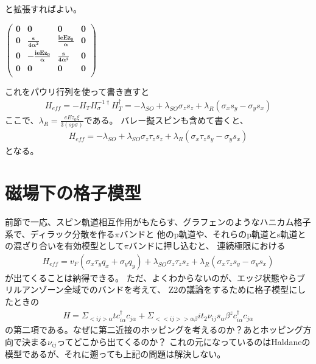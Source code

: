 \documentclass{article}
\begin{document}
と拡張すればよい。

\begin{doublespace}
\noindent\(\pmb{\left(
\begin{array}{cccc}
 0 & 0 & 0 & 0 \\
 0 & \frac{s}{4 \alpha ^2} & \frac{i \text{e$Ez_0$}}{ \alpha } & 0 \\
 0 & -\frac{i \text{e$Ez_0$}}{ \alpha } & \frac{s}{4 \alpha ^2} & 0 \\
 0 & 0 & 0 & 0 \\
\end{array}
\right)}\)
\end{doublespace}

これをパウリ行列を使って書き直すと
\begin{eqnarray}
H_{eff}=-H_T
H_\sigma^{-1\dagger}H_T^\dagger = -\lambda_{SO}+\lambda_{SO} \sigma_z
s_z+\lambda_{R} (\sigma_x s_y -\sigma_{y} s_x)
\end{eqnarray}
ここで、$\lambda_R=\frac{eEz_0 \xi}{3(sp\sigma)}$である。
バレー擬スピンも含めて書くと、
\begin{eqnarray}
H_{eff}= -\lambda_{SO}+\lambda_{SO} \sigma_z \tau_z s_z+\lambda_{R} (\sigma_x
\tau_z s_y -\sigma_{y} s_x)
\end{eqnarray}
となる。

\section{磁場下の格子模型}
前節で一応、スピン軌道相互作用がもたらす、グラフェンのようなハニカム格子系で、ディラック分散を作る$\pi$バンドと
他のp軌道や、それらのp軌道とs軌道との混ざり合いを有効模型として$\pi$バンドに押し込むと、
連続極限における
\begin{eqnarray}
H_{eff}=  v_F (\sigma_x\tau_y q_x + \sigma_y q_y)+\lambda_{SO} \sigma_z \tau_z
s_z+\lambda_{R} (\sigma_x \tau_z s_y -\sigma_{y} s_x)
\end{eqnarray}
が出てくることは納得できる。
ただ、よくわからないのが、エッジ状態やらブリルアンゾーン全域でのバンドを考えて、
Z2の議論をするために格子模型にしたときの
\begin{eqnarray}
H=\Sigma_{<ij>\alpha} tc_{i\alpha}^\dagger c_{j\alpha}+\Sigma_{<<ij>>\alpha
\beta} it_2 \nu_{ij} s_\alpha\beta ^z c_{i\alpha}^\dagger c_{j\alpha}
\end{eqnarray}
の第二項である。なぜに第二近接のホッピングを考えるのか？あとホッピング方向で決まる$\nu_{ij}$ってどこから出てくるのか？
これの元になっているのはHaldaneの模型であるが、それに遡っても上記の問題は解決しない。
\end{document}
